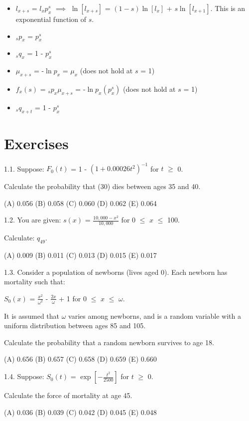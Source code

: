 \documentclass[]{book}
\begin{document}
\begin{itemize}
\item
  \(l_{x + s}\) = \(l_x\)\(p^s_x\) \(\implies\) \(\ln[l_{x + s}]\) =
  \((1 - s)\ln[l_x]\) + \(s\ln[l_{x + 1}]\). This is an exponential
  function of \(s\).
\item
  \({}_{s}p_x\) = \(p^s_x\)
\item
  \({}_{s}q_x\) = 1 - \(p^s_x\)
\item
  \(\mu_{x + s}\) = -\(\ln p_x\) = \(\mu_x\) (does not hold at \(s\) =
  1)
\item
  \(f_x(s)\) = \({}_{s}p_x\)\(\mu_{x + s}\) = -\(\ln p_x\)\((p^s_x)\)
  (does not hold at \(s\) = 1)
\item
  \({}_{s}q_{x + t}\) = 1 - \(p^s_x\)
\end{itemize}

\section{Exercises}\label{exercises}

1.1. Suppose: \(F_0(t)\) = 1 - \((1 + 0.00026t^2)^{-1}\) for \(t\)
\(\ge\) 0.

Calculate the probability that (30) dies between ages 35 and 40.

(A) 0.056 (B) 0.058 (C) 0.060 (D) 0.062 (E) 0.064

1.2. You are given: \(s(x)\) = \(\frac{10,000 - x^2}{10,000}\) for 0
\(\le\) \(x\) \(\le\) 100.

Calculate: \(q_{49}\).

(A) 0.009 (B) 0.011 (C) 0.013 (D) 0.015 (E) 0.017

1.3. Consider a population of newborns (lives aged 0). Each newborn has
mortality such that:

\(S_0(x)\) = \(\frac{x^2}{\omega^2}\) - \(\frac{2x}{\omega}\) + 1 for 0
\(\le\) \(x\) \(\le\) \(\omega\).

It is assumed that \(\omega\) varies among newborns, and is a random
variable with a uniform distribution between ages 85 and 105.

Calculate the probability that a random newborn survives to age 18.

(A) 0.656 (B) 0.657 (C) 0.658 (D) 0.659 (E) 0.660

1.4. Suppose: \(S_0(t)\) = \(\exp[-\frac{t^2}{2500}]\) for \(t\) \(\ge\)
0.

Calculate the force of mortality at age 45.

(A) 0.036 (B) 0.039 (C) 0.042 (D) 0.045 (E) 0.048
\end{document}
